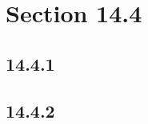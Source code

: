 





\section*{Section 14.4}

\subsection*{14.4.1}
\begin{enumerate}
\end{enumerate}

\subsection*{14.4.2}
\begin{enumerate}
\end{enumerate}

